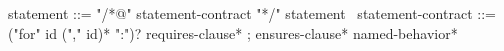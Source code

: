 \begin{syntax}
  statement ::= "/*@" statement-contract "*/" statement
  \
  statement-contract ::= {("for" id ("," id)* ":")?} requires-clause* ;
    ensures-clause* named-behavior*
\end{syntax}
